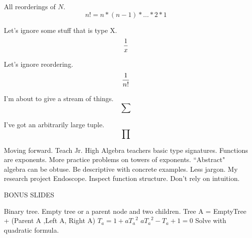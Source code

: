 \documentclass{beamer}
\begin{document}
\begin{frame}[fragile]
All reorderings of $N$.
$$n! = n*(n-1)*...*2*1$$
\end{frame}


\begin{frame}[fragile]
Let's ignore some stuff that is type X.
$${1\over x}$$
\end{frame}

\begin{frame}[fragile]
Let's ignore reordering.
$${1\over n!}$$
\end{frame}

\begin{frame}[fragile]
I'm about to give a stream of things.
$$\sum$$
\end{frame}

\begin{frame}[fragile]
I've got an arbitrarily large tuple.
$$\prod$$
\end{frame}



\begin{frame}[fragile]
Moving forward.\newline\newline
Teach Jr. High Algebra teachers basic type signatures.\newline\newline
Functions are exponents. More practice problems on towers of exponents.\newline\newline 
``Abstract" algebra can be obtuse. Be descriptive with concrete examples. Less jargon.\newline\newline
My research project Endoscope. Inspect function structure. Don't rely on intuition.
\end{frame}


\begin{frame}[fragile]
BONUS SLIDES

\end{frame}

\begin{frame}
Binary tree.\newline\newline
Empty tree or a parent node and two children. \newline\newline
Tree  A = EmptyTree + (Parent A ,Left A, Right  A)\newline\newline
$T_{a} = 1+a{T_{a}}^{2} $\newline\newline
$a{T_{a}}^{2 } - T_{a}+ 1  = 0$\newline\newline
Solve with quadratic formula.\newline\newline
\end{frame}
\end{document}

